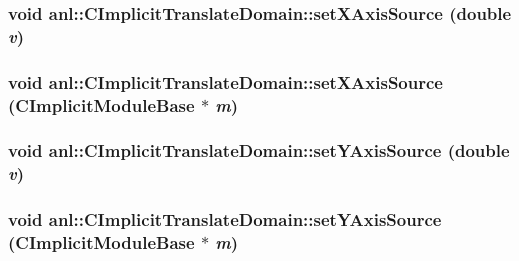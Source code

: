 \label{classanl_1_1CImplicitTranslateDomain_ac834b7b2164fb488b159015c478d7c2b}
\hypertarget{classanl_1_1CImplicitTranslateDomain_a7fdc43419fae7a3b06e4300d6f42eb56}{
\subsubsection[{setXAxisSource}]{\setlength{\rightskip}{0pt plus 5cm}void anl::CImplicitTranslateDomain::setXAxisSource (double {\em v})}}
\label{classanl_1_1CImplicitTranslateDomain_a7fdc43419fae7a3b06e4300d6f42eb56}
\hypertarget{classanl_1_1CImplicitTranslateDomain_afcec802af7d592ad8d4857db58a2ee05}{
\subsubsection[{setXAxisSource}]{\setlength{\rightskip}{0pt plus 5cm}void anl::CImplicitTranslateDomain::setXAxisSource ({\bf CImplicitModuleBase} $\ast$ {\em m})}}
\label{classanl_1_1CImplicitTranslateDomain_afcec802af7d592ad8d4857db58a2ee05}
\hypertarget{classanl_1_1CImplicitTranslateDomain_a680081eb635da849e969dfe20ea3c2b2}{
\subsubsection[{setYAxisSource}]{\setlength{\rightskip}{0pt plus 5cm}void anl::CImplicitTranslateDomain::setYAxisSource (double {\em v})}}
\label{classanl_1_1CImplicitTranslateDomain_a680081eb635da849e969dfe20ea3c2b2}
\hypertarget{classanl_1_1CImplicitTranslateDomain_afc1d80f04ed101a3a1d80482490f3fd6}{
\subsubsection[{setYAxisSource}]{\setlength{\rightskip}{0pt plus 5cm}void anl::CImplicitTranslateDomain::setYAxisSource ({\bf CImplicitModuleBase} $\ast$ {\em m})}}
